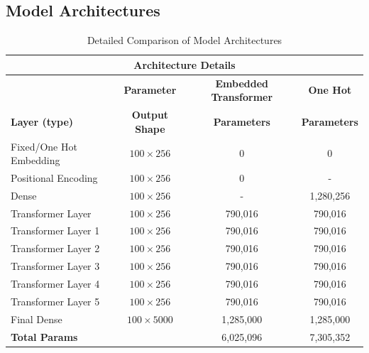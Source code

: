 \documentclass[12pt]{article} \usepackage{COSC420style} \usepackage{soul}
\begin{document}
\subsection{Model Architectures}
\begin{table}[htbp]
	\centering
	\caption{Detailed Comparison of Model Architectures}
	\label{tab:model_architectures}
	\begin{tabular}{lccc}
		\toprule
		\multicolumn{4}{c}{\textbf{Architecture Details}}                                                     \\
		\midrule
		                        & \textbf{Parameter}    & \textbf{Embedded Transformer} & \textbf{One Hot}    \\
		\midrule
		\textbf{Layer (type)}   & \textbf{Output Shape} & \textbf{Parameters}           & \textbf{Parameters} \\
		\midrule
		Fixed/One Hot Embedding & \(100 \times 256\)    & 0                             & 0                   \\
		Positional Encoding     & \(100 \times 256\)    & 0                             & -                   \\
		Dense                   & \(100 \times 256\)    & -                             & 1,280,256           \\
		Transformer Layer       & \(100 \times 256\)    & 790,016                       & 790,016             \\
		Transformer Layer 1     & \(100 \times 256\)    & 790,016                       & 790,016             \\
		Transformer Layer 2     & \(100 \times 256\)    & 790,016                       & 790,016             \\
		Transformer Layer 3     & \(100 \times 256\)    & 790,016                       & 790,016             \\
		Transformer Layer 4     & \(100 \times 256\)    & 790,016                       & 790,016             \\
		Transformer Layer 5     & \(100 \times 256\)    & 790,016                       & 790,016             \\
		Final Dense             & \(100 \times 5000\)   & 1,285,000                     & 1,285,000           \\
		\midrule
		\textbf{Total Params}   &                       & 6,025,096                     & 7,305,352           \\
		\bottomrule
	\end{tabular}
\end{table}
\end{document}
